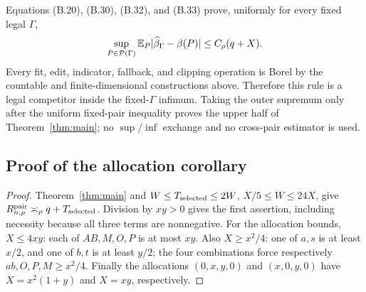 Equations (B.20), (B.30), (B.32), and (B.33) prove, uniformly for every
fixed legal \(\Gamma\),
\[
 \sup_{P\in\mathcal P(\Gamma)}
 \mathbb E_P\lvert \widehat\beta_\Gamma-\beta(P)\rvert\le C_\rho(q+X).
\]
Every fit, edit, indicator, fallback, and clipping operation is Borel by the
countable and finite-dimensional constructions above.  Therefore this rule
is a legal competitor inside the fixed-\(\Gamma\) infimum.  Taking the outer
supremum only after the uniform fixed-pair inequality proves the upper half
of Theorem~\ref{thm:main}; no \(\sup/\inf\) exchange and no cross-pair
estimator is used.


\subsection{Proof of the allocation corollary}
\label{app:allocation-proof}
\begin{proof}
Theorem~\ref{thm:main} and \(W\le T_{\rm selected}\le2W\), \(X/5\le W\le24X\), give \(R^{\mathrm{pair}}_{n,\rho}\asymp_\rho q+T_{\rm selected}\). Division by \(xy>0\) gives the first assertion, including necessity because all three terms are nonnegative.
For the allocation bounds, \(X\le4xy\): each of \(AB,M,O,P\) is at most \(xy\). Also \(X\ge x^2/4\): one of \(a,s\) is at least \(x/2\), and one of \(b,t\) is at least \(y/2\); the four combinations force respectively \(ab,O,P,M\ge x^2/4\). Finally the allocations \((0,x,y,0)\) and \((x,0,y,0)\) have \(X=x^2(1+y)\) and \(X=xy\), respectively.
\end{proof}
